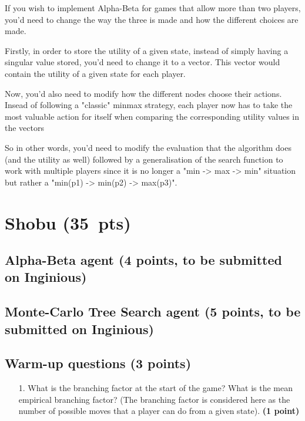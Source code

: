 \documentclass[11pt,a4paper]{report}
\begin{document}
\begin{answers}[9cm]
If you wish to implement Alpha-Beta for games that allow more than two players, you'd need to change the way the three is made and how the different choices are made. 

Firstly, in order to store the utility of a given state, instead of simply having a singular value stored, you'd need to change it to a vector. 
This vector would contain the utility of a given state for each player.

Now, you'd also need to modify how the different nodes choose their actions. Insead of following a "classic" minmax strategy, each player now has to take the most valuable action for itself when comparing the corresponding utility values in the vectors

So in other words, you'd need to modify the evaluation that the algorithm does (and the utility as well) followed by a generalisation of the search function to work with multiple players since it is no longer a "min -> max -> min" situation but rather a "min(p1) -> min(p2) -> max(p3)".
\end{answers}





\clearpage
\section{Shobu (35~pts)}
\medskip

\subsection{Alpha-Beta agent (4 points, to be submitted on Inginious)}
\medskip


\subsection{Monte-Carlo Tree Search agent (5 points, to be submitted on Inginious)}
\medskip


\subsection{Warm-up questions (3 points)}
\begin{enumerate}
\item[1.] What is the branching factor at the start of the game? What is the mean empirical branching factor? (The branching factor is considered here as the number of possible moves that a player can do from a given state). \textbf{(1 point)}
\end{enumerate}
\end{document}
